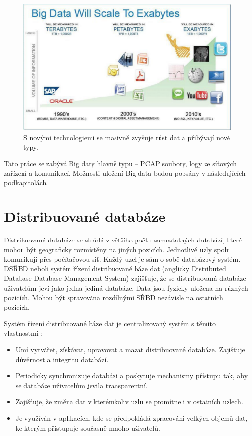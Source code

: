 \begin{figure}[!h]
  \centering
  \includegraphics[width=15cm]{template-fig/big_data_exabytes.pdf}
  \caption{S novými technologiemi se masivně zvyšuje růst dat a přibývají nové typy. \cite{rajeshBigData}}
  \label{FIG_BigDataExabytes}
\end{figure}

\noindent Tato práce se zabývá Big daty hlavně typu – PCAP soubory, logy ze síťových zařízení a komunikací. Možnosti uložení Big data budou popsány v následujících podkapitolách.

\section{Distribuované databáze}
Distribuovaná databáze se skládá z většího počtu samostatných databází, které mohou být geograficky rozmístěny na jiných pozicích. Jednotlivé uzly spolu komunikují přes počítačovou síť. Každý uzel je sám o sobě databázový systém. DSŘBD neboli systém řízení distribuované báze dat (anglicky Distributed Database Database Management System) zajišťuje, že se distribuovaná databáze uživatelům jeví jako jedna jediná databáze. Data jsou fyzicky uložena na různých pozicích. Mohou být spravována rozdílnými SŘBD nezávisle na ostatních pozicích. \cite{distributedDBMS}

Systém řízení distribuované báze dat je centralizovaný systém s těmito vlastnostmi 
\cite{distributedDBMS}:

\begin{itemize}
\item Umí vytvářet, získávat, upravovat a mazat distribuované databáze. Zajišťuje důvěrnost a integritu databází.

\item Periodicky synchronizuje databázi a poskytuje mechanismy přístupu tak, aby se databáze uživatelům jevila transparentní.

\item Zajišťuje, že změna dat v kterémkoliv uzlu se promítne i v ostatních uzlech.

\item Je využíván v aplikacích, kde se předpokládá zpracování velkých objemů dat, ke kterým přistupuje současně mnoho uživatelů.
\end{itemize}


